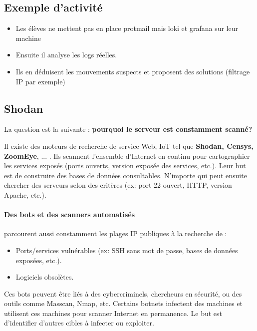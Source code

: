 \documentclass[french, 12pt]{article}%
\newcommand{\itemE}{\item[$\bullet$]}
\begin{document}
\subsection{Exemple d'activité}

\begin{itemize}
\itemE Les élèves ne mettent pas en place protmail mais loki et grafana sur leur machine
\itemE Ensuite il analyse les logs réelles. 

\itemE Ils en déduisent les mouvements suspects et proposent des solutions (filtrage IP par exemple)
\end{itemize}


\subsection{Shodan}

La question est la suivante : \textbf{pourquoi le serveur est constamment scanné?} 

\vspace{0.5cm
}
Il existe des moteurs de recherche de service Web, IoT tel que \textbf{Shodan, Censys, ZoomEye}, ... . Ils scannent l'ensemble d'Internet en continu pour cartographier les services exposés (ports ouverts, version exposée des services, etc.).
Leur but est de construire des bases de données consultables. N'importe qui peut ensuite chercher des serveurs selon des critères (ex: port 22 ouvert, HTTP, version Apache, etc.).

\paragraph{Des bots et des scanners automatisés } parcourent aussi constamment les plages IP publiques à la recherche de :
\begin{itemize}
\itemE Ports/services vulnérables (ex: SSH sans mot de passe, bases de données exposées, etc.).
\itemE Logiciels obsolètes.
\end{itemize}
Ces bots peuvent être liés à des cybercriminels, chercheurs en sécurité, ou des outils comme Masscan, Nmap, etc.  Certains botnets infectent des machines et utilisent ces machines pour scanner Internet en permanence. Le but est d’identifier d'autres cibles à infecter ou exploiter.
\end{document}
